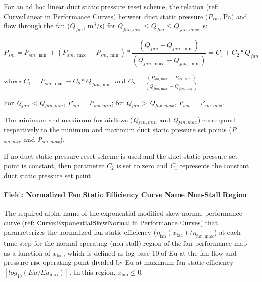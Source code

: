 For an ad hoc linear duct static pressure reset scheme, the relation (ref: \hyperref[curvelinear]{Curve:Linear} in Performance Curves) between duct static pressure (\(P_{sm}\), Pa) and flow through the fan (\(Q_{fan}\), m\(^{3}\)/s) for \(Q_{fan,min} \le Q_{fan} \le Q_{fan,max}\) is:

\begin{equation}
P_{sm} = P_{sm,\min } + \left( P_{sm,\max } - P_{sm,\min } \right) * \frac{{\left( {{Q_{fan}} - {Q_{fan,\min }}} \right)}}{{\left( {{Q_{fan,\max }} - {Q_{fan,\min }}} \right)}} = {C_1} + {C_2}*{Q_{fan}}
\end{equation}

where \({C_1} = {P_{sm,\min }} - {C_2}*{Q_{fan,\min }}\) and \({C_2} = \frac{{\left( {{P_{sm,\max }} - {P_{sm,\min }}} \right)}}{{\left( {{Q_{fan,\max }} - {Q_{fan,\min }}} \right)}}\)

For \emph{Q\(_{fan}\)} \textless{} \emph{Q\(_{fan,min}\)}, \emph{P\(_{sm}\)} = \emph{P\(_{sm,min}\)}; for \emph{Q\(_{fan}\)} \textgreater{} \emph{Q\(_{fan,max}\)}, \emph{P\(_{sm}\)} = \emph{P\(_{sm,max}\)}.

The minimum and maximum fan airflows (\emph{Q\(_{fan,min}\)} and \emph{Q\(_{fan,max}\)}) correspond respectively to the minimum and maximum duct static pressure set points (\emph{P\(_{sm,min}\)} and \emph{P\(_{sm,max}\)}).

If no duct static pressure reset scheme is used and the duct static pressure set point is constant, then parameter \emph{C\(_{2}\)} is set to zero and \emph{C\(_{1}\)} represents the constant duct static pressure set point.

\paragraph{Field: Normalized Fan Static Efficiency Curve Name Non-Stall Region}\label{field-normalized-fan-static-efficiency-curve-name-non-stall-region}

The required alpha name of the exponential-modified skew normal performance curve (ref: \hyperref[curveexponentialskewnormal]{Curve:ExponentialSkewNormal} in Performance Curves) that parameterizes the normalized fan static efficiency (\(\eta_{\mathrm{fan}}(x_{\mathrm{fan}}) / \eta_{\mathrm{fan, max}}\)) at each time step for the normal operating (non-stall) region of the fan performance map as a function of \(x_{\mathrm{fan}}\), which is defined as log-base-10 of Eu at the fan flow and pressure rise operating point divided by Eu at maximum fan static efficiency \([log_{10}(Eu / Eu_{\mathrm{max}})]\). In this region, \(x_{\mathrm{fan}} \le 0\).

